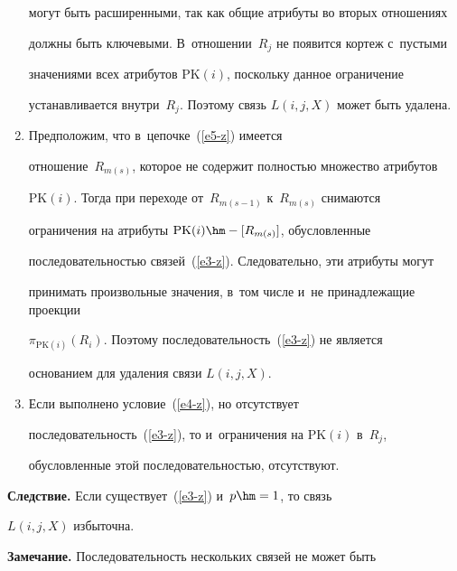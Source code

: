 \begin{multicols}{2}
\begin{enumerate}[1.]
могут быть расширенными, так как общие атрибуты во вторых отношениях

должны быть ключевыми. В~отношении~$R_j$ не появится кортеж с~пустыми

значениями всех атрибутов $\mathrm{PK}(i)$, поскольку данное ограничение

уста\-нав\-ливается внутри~$R_j$. Поэтому связь $L(i,j,X)$ может быть удалена.



\pagebreak



  \item Предположим, что в~цепочке~(\ref{e5-z}) имеется

отношение~$R_{m(s)}$, которое не содержит полностью множество атрибутов

$\mathrm{PK}(i)$. Тогда при переходе от~$R_{m(s-1)}$ к~$R_{m(s)}$ снимаются

ограничения на атрибуты $\mathrm{PK}(i)\hm- [R_{m(s)}]$, обусловленные

последовательностью связей~(\ref{e3-z}). Следовательно, эти атрибуты могут

принимать произвольные значения, в~том числе и~не принадлежащие проекции

$\pi_{\mathrm{PK}(i)}(R_i)$. Поэтому последовательность~(\ref{e3-z}) не является

основанием для удаления связи $L(i,j,X)$.

  \item Если выполнено условие~(\ref{e4-z}), но отсутствует

последовательность~(\ref{e3-z}), то и~ограничения на $\mathrm{PK}(i)$ в~$R_j$,

обусловленные этой последовательностью, отсутствуют.

  \end{enumerate}






  \noindent

  \textbf{Следствие.} Если существует~(\ref{e3-z}) и~$p\hm=1$, то связь

$L(i,j,X)$ избыточна.



  \smallskip



  \noindent

  \textbf{Замечание.} Последовательность нескольких связей не может быть


\end{multicols}
